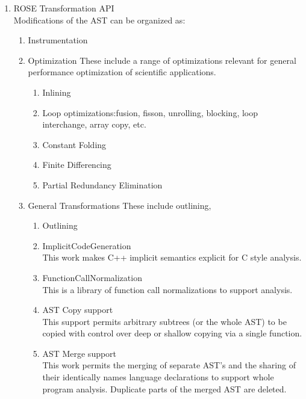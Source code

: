\begin{enumerate}
\begin{enumerate}
      \item ROSE Transformation API \\
         Modifications of the AST can be organized as:
         \begin{enumerate}
            \item Instrumentation
            \item Optimization
               These include a range of optimizations relevant for general performance
               optimization of scientific applications.
            \begin{enumerate}
               \item Inlining
               \item Loop optimizations:fusion, fisson, unrolling, blocking, loop
                  interchange, array copy, etc.
               \item Constant Folding
               \item Finite Differencing
               \item Partial Redundancy Elimination
            \end{enumerate}

            \item General Transformations
               These include outlining,
            \begin{enumerate}
               \item Outlining
               \item ImplicitCodeGeneration \\
                  This work makes C++ implicit semantics explicit for C style analysis.
               \item FunctionCallNormalization \\
                  This is a library of function call normalizations to support analysis.
               \item AST Copy support \\
                  This support permits arbitrary subtrees (or the whole AST) to be copied
                  with control over deep or shallow copying via a single function.
               \item AST Merge support \\
                  This work permits the merging of separate AST's and the sharing of their
                  identically names language declarations to support whole program
                  analysis. Duplicate parts of the merged AST are deleted.
            \end{enumerate}
         \end{enumerate}


\end{enumerate}
\end{enumerate}
